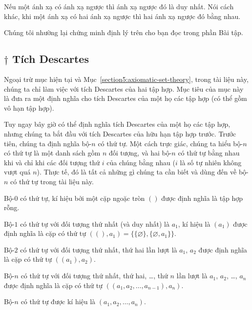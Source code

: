 \begin{theorem}
    Nếu một ánh xạ có ánh xạ ngược thì ánh xạ ngược đó là duy nhất. Nói cách khác, khi một ánh xạ có hai ánh xạ ngược thì hai ánh xạ ngược đó bằng nhau.
\end{theorem}

Chúng tôi nhường lại chứng minh định lý trên cho bạn đọc trong phần Bài tập.

\subsection{$\dagger$ Tích Descartes}

Ngoại trừ mục hiện tại và Mục~\ref{section5:axiomatic-set-theory}, trong tài liệu này, chúng ta chỉ làm việc với tích Descartes của hai tập hợp. Mục tiêu của mục này là đưa ra một định nghĩa cho tích Descartes của một họ các tập hợp (có thể gồm vô hạn tập hợp).

Tuy ngay bây giờ có thể định nghĩa tích Descartes của một họ các tập hợp, nhưng chúng ta bắt đầu với tích Descartes của hữu hạn tập hợp trước. Trước tiên, chúng ta định nghĩa bộ-$n$ có thứ tự. Một cách trực giác, chúng ta hiểu bộ-$n$ có thứ tự là một danh sách gồm $n$ đối tượng, và hai bộ-$n$ có thứ tự bằng nhau khi và chỉ khi các đối tượng thứ $i$ của chúng bằng nhau ($i$ là số tự nhiên không vượt quá $n$). Thực tế, đó là tất cả những gì chúng ta cần biết và dùng đến về bộ-$n$ có thứ tự trong tài liệu này.

\begin{definition}[Bộ-$n$ có thứ tự]
    Bộ-$0$ có thứ tự, kí hiệu bởi một cặp ngoặc tròn $()$ được định nghĩa là tập hợp rỗng.

    Bộ-$1$ có thứ tự với đối tượng thứ nhất (và duy nhất) là $a_{1}$, kí hiệu là $(a_{1})$ được định nghĩa là cặp có thứ tự $((), a_{1}) = \{ \{ \varnothing \}, \{ \varnothing, a_{1} \} \}$.

    Bộ-$2$ có thứ tự với đối tượng thứ nhất, thứ hai lần lượt là $a_{1}$, $a_{2}$ được định nghĩa là cặp có thứ tự $((a_{1}), a_{2})$.

    Bộ-$n$ có thứ tự với đối tượng thứ nhất, thứ hai, \ldots, thứ $n$ lần lượt là $a_{1}$, $a_{2}$, \ldots, $a_{n}$ được định nghĩa là cặp có thứ tự $((a_{1}, a_{2}, \ldots, a_{n-1}), a_{n})$.

    Bộ-$n$ có thứ tự được kí hiệu là $(a_{1}, a_{2}, \ldots, a_{n})$.
\end{definition}


